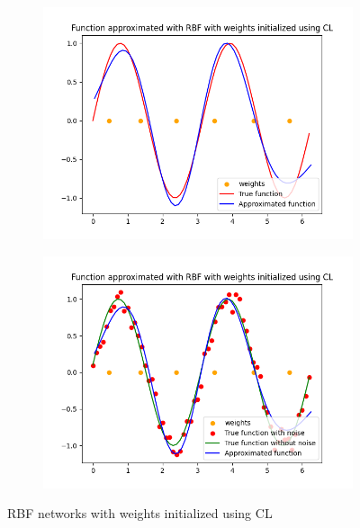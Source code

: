 \documentclass[a4paper]{article}
\begin{document}
\begin{figure}[ht]
    \centering
    \begin{subfigure}{0.4\textwidth}
        \centering
        \includegraphics[width=\textwidth]{Labs/Lab 2/Steinar/results/no-noise-approx-cl.png}
    \end{subfigure}
    \hfill
    \begin{subfigure}{0.4\textwidth}
        \centering
        \includegraphics[width=\textwidth]{Labs/Lab 2/Steinar/results/noise-function-cl.png}
    \end{subfigure}
    \caption{RBF networks with weights initialized using CL}
    \label{fig:cl}
\end{figure}
\end{document}

